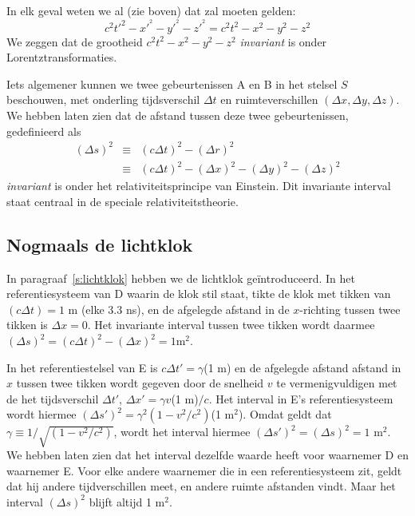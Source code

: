 In elk geval weten we al (zie boven) dat zal moeten gelden:
\begin{equation}
\label{v:lorentz1}
c^2 t'^2 - x'^{^{2}} - y'^{^{2}} - z'^{^{2}} = c^2 t^2 - x^{2} - y^{2} - z^{2} 
\end{equation}
We zeggen dat de grootheid $c^2 t^2 - x^{2} - y^{2} - z^{2}$
{\sl invariant} is onder Lorentztransformaties. 

Iets algemener kunnen we twee gebeurtenissen A en B in het stelsel $S$ beschouwen, met onderling tijdsverschil $\Delta t$ en
ruimteverschillen $(\Delta x,\Delta y, \Delta z)$. We hebben laten zien dat de afstand tussen deze twee gebeurtenissen,
gedefinieerd als 
\begin{eqnarray}
(\Delta s)^2 & \equiv & (c \Delta t)^2 - (\Delta r)^2 \\
             & \equiv & (c \Delta t)^2 - (\Delta x)^2 - (\Delta y)^2 - (\Delta z)^2
\end{eqnarray}
{\it invariant} is onder het relativiteitsprincipe van Einstein.
Dit invariante interval staat centraal in de speciale relativiteitstheorie.

\subsection{Nogmaals de lichtklok}
In paragraaf~\ref{s:lichtklok} hebben we de lichtklok
ge\"introduceerd. In het referentiesysteem van D waarin de klok stil staat, tikte de klok met
tikken van $(c\Delta t)=1$ m (elke 3.3 ns), en de afgelegde afstand in de $x$-richting tussen twee tikken is $\Delta
x=0$. Het invariante interval tussen twee tikken wordt daarmee $(\Delta
s)^2 = (c \Delta t)^2-(\Delta x)^2 = 1 $m$^2$. 

In het referentiestelsel
van E is $c \Delta t' = \gamma$(1 m) en de afgelegde afstand afstand in $x$ tussen twee tikken wordt
gegeven door de snelheid $v$ te vermenigvuldigen met de het tijdsverschil $\Delta t'$, $\Delta x' = \gamma v$(1 m)$/c$. Het
interval in E's referentiesysteem wordt hiermee $(\Delta s')^2
=\gamma^2(1-v^2/c^2)$(1 m$^2$). Omdat geldt dat $\gamma\equiv
1/\sqrt{(1-v^2/c^2)}$, wordt het interval hiermee $(\Delta s')^2 =
(\Delta s)^2 = 1$ m$^2$. We hebben laten zien dat het interval
dezelfde waarde heeft voor waarnemer D en waarnemer E. Voor elke
andere waarnemer die in een referentiesysteem zit, geldt dat hij
andere tijdverschillen meet, en andere ruimte afstanden vindt. Maar het
interval $(\Delta s)^2$ blijft altijd 1 m$^2$.


